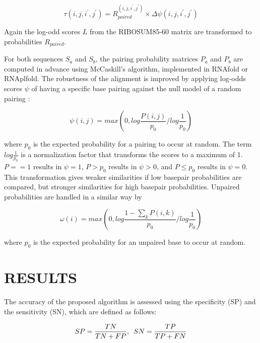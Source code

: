 \documentclass[a4paper,twoside]{article}
\begin{document}
\begin{equation}\label{eq10}
	\tau(i,j,i^\prime,j^\prime) = R_{paired}^{(i,j,i^\prime,j^\prime)}
\times \Delta \psi(i,j,i^\prime,j^\prime)
\end{equation}

Again the log-odd scores $L$ from the RIBOSUM85-60 matrix \cite{Klein14499004}
are transformed to probabilities $R_{paired}$.

For both sequences $S_a$ and $S_b$, the pairing probability matrices $P_a$ and
$P_b$ are computed in advance using McCaskill's algorithm, implemented in
RNAfold or RNAplfold. The robustness of the alignment is improved by applying
log-odds scores $\psi$ of having a specific base pairing against the null model
of a random pairing \cite{Will17432929}:

\begin{equation}\label{eq11}
	\psi(i,j) = max \left( 0, log \frac{P(i,j)}{p_0} / log \frac{1}{p_0} \right)
\end{equation}

where $p_0$ is the expected probability for a pairing to occur at random. The
term $log \frac{1}{p_0}$ is a normalization factor that transforms the scores to
a maximum of 1. $P==1$ results in $\psi=1$, $P>p_0$ results in $\psi>0$, and $P\le
p_0$ results in $\psi=0$.  This transformation gives weaker similarities if low
basepair probabilities are compared, but stronger similarities for high basepair
probabilities. Unpaired probabilities are handled in a similar way by

\begin{equation}\label{eq12}
	\omega(i) = max \left( 0, log \frac{1 - \sum_k P(i,k)}{p_0} / log \frac{1}{p_0} \right)
\end{equation}

where $p_0$ is the expected probability for an unpaired base to occur at
random.


\section{\uppercase{Results}}

\noindent The accuracy of the proposed algorithm is assessed using the
specificity (SP) and the sensitivity (SN), which are defined as follows:

\begin{equation}\label{eq13}
	SP = \frac{TN}{TN + FP}, \hspace{5px} SN = \frac{TP}{TP + FN}
\end{equation}
\end{document}
